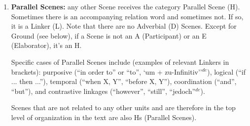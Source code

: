 \documentclass[11pt]{article}
\newcommand{\german}[1]{{\color{red}#1$^{de}$}}
\newcommand{\dn}[1]{{\color{green}{#1}}}
\newcommand{\oa}[1]{{\color{blue}{OA: #1}}}
\newcommand{\nss}[1]{{\color{magenta}{NSS: #1}}}
\newcommand{\rem}[1]{{(\it #1})}
\begin{document}
\begin{enumerate}
\item
  {\bf Parallel Scenes:} any other Scene receives the category Parallel Scene (H). Sometimes there
  is an accompanying relation word and sometimes not. If so, it is a Linker (L). Note that there are no Adverbial (D) Scenes.
  Except for Ground (see below), if a Scene is not an A (Participant) or an E (Elaborator), it's an H.


  Specific cases of Parallel Scenes include (examples of relevant Linkers in brackets): purposive (``in order to'' or ``to''\german{, `um + zu-Infinitiv''}), logical (``if ... then ...''), temporal (``when X, Y'', ``before X, Y''), coordination (``and'', ``but''), and contrastive linkages (``however'', ``still''\german{, ``jedoch''}).

Scenes that are not related to any other units and are therefore in the top level of organization in the text are also Hs (Parallel Scenes). 


\end{enumerate}
\end{document}
